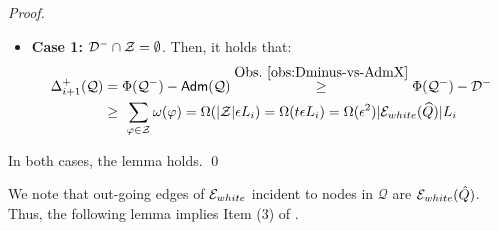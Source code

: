 \begin{proof}
\begin{itemize}
		\item  \textbf{Case 1:} $\mathcal{D}^- \cap \mathcal{Z} = \emptyset$. Then, it holds that:
		\begin{equation*}
			\begin{split}
				\Delta^+_{i+1}(\mathcal{Q}) &= \Phi(\mathcal{Q}^-) - \mathsf{Adm}(\mathcal{Q}) \stackrel{\mbox{Obs.~\ref{obs:Dminus-vs-AdmX}}}{\geq }\Phi(\mathcal{Q}^-) - \mathcal{D}^- \\
				&\geq~ \sum_{\varphi \in \mathcal{Z}} \omega(\varphi)  = \Omega(|\mathcal{Z}|\epsilon L_i) = \Omega(t\epsilon L_i)  =  \Omega(\epsilon^2) |\mathcal{E}_{white}(\widehat{Q})| L_i 
			\end{split}
		\end{equation*}
	\end{itemize} 
	In both cases,  the lemma holds. \qed
\end{proof}

We note that out-going edges of $\mathcal{E}_{white}$ incident to nodes in $\mathcal{Q}$ are $\mathcal{E}_{white}(\hat{Q})$. Thus, the following lemma implies  Item (3) of . 

